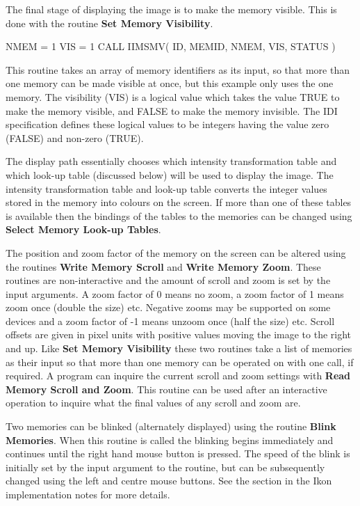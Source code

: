 \documentclass[11pt,nolof]{starlink}
\begin{document}
The final stage of displaying the image is to make the memory visible.
This is done with the routine \textbf{Set Memory Visibility}.
\begin{small}
\begin{terminalv}
      NMEM = 1
      VIS = 1
      CALL IIMSMV( ID, MEMID, NMEM, VIS, STATUS )
\end{terminalv}
\end{small}
This routine takes an array of memory identifiers as its input, so
that more than one memory can be made visible at once, but this example
only uses the one memory. The visibility (VIS) is a logical value which
takes the value TRUE to make the memory visible, and FALSE to make
the memory invisible. The IDI specification defines these logical
values to be integers having the value zero (FALSE) and non-zero
(TRUE).

The display path essentially chooses which intensity transformation
table and which look-up table (discussed below) will be used to display
the image. The intensity transformation table and look-up table converts
the integer values stored in the memory into colours on the screen.
If more than one of these tables is available then the bindings
of the tables to the memories can be changed using
\textbf{Select Memory Look-up Tables}.

The position and zoom factor of the memory on the screen can be altered
using the routines \textbf{Write Memory Scroll} and \textbf{Write Memory Zoom}.
These routines are non-interactive and the amount of scroll and zoom
is set by the input arguments.
A zoom factor of 0 means no zoom, a zoom factor of 1 means zoom once
(double the size) etc. Negative zooms may be supported on some
devices and a zoom factor of -1 means unzoom once (half the size) etc.
Scroll offsets are given in pixel units with positive values moving
the image to the right and up. Like \textbf{Set Memory Visibility}
these two routines take a list of memories as their input so that
more than one memory can be operated on with one call, if required.
A program can inquire the current scroll and zoom settings with
\textbf{Read Memory Scroll and Zoom}. This routine can be used
after an interactive operation to inquire what the final values of
any scroll and zoom are.

Two memories can be blinked (alternately displayed) using the routine
\textbf{Blink Memories}. When this routine is called the blinking begins
immediately and continues until the right hand mouse button is pressed.
The speed of the blink is initially set by the input argument to the
routine, but can be subsequently changed using the left and centre
mouse buttons. See the section in the Ikon implementation notes for
more details.
\end{document}
